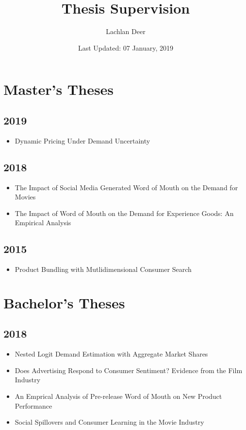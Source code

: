 \documentclass[]{article}
\title{Thesis Supervision}
\author{Lachlan Deer}
\date{Last Updated: 07 January, 2019}
\providecommand{\tightlist}{%
  \setlength{\itemsep}{0pt}\setlength{\parskip}{0pt}}
\begin{document}
\maketitle

\section{Master's Theses}\label{masters-theses}

\subsection{2019}\label{section}

\begin{itemize}
\tightlist
\item
  Dynamic Pricing Under Demand Uncertainty
\end{itemize}

\subsection{2018}\label{section-1}

\begin{itemize}
\tightlist
\item
  The Impact of Social Media Generated Word of Mouth on the Demand for
  Movies
\item
  The Impact of Word of Mouth on the Demand for Experience Goods: An
  Empirical Analysis
\end{itemize}

\subsection{2015}\label{section-2}

\begin{itemize}
\tightlist
\item
  Product Bundling with Mutlidimensional Consumer Search
\end{itemize}

\section{Bachelor's Theses}\label{bachelors-theses}

\subsection{2018}\label{section-3}

\begin{itemize}
\tightlist
\item
  Nested Logit Demand Estimation with Aggregate Market Shares
\item
  Does Advertising Respond to Consumer Sentiment? Evidence from the Film
  Industry
\item
  An Emprical Analysis of Pre-release Word of Mouth on New Product
  Performance
\item
  Social Spillovers and Consumer Learning in the Movie Industry
\end{itemize}
\end{document}
